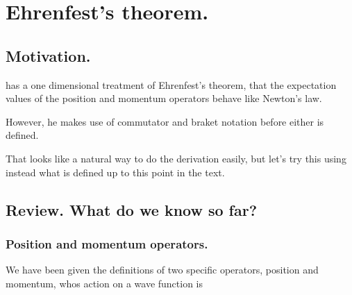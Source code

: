
%
%


\chapter{Ehrenfest's theorem. }
\label{chap:ehrenfest}
\date{ Jan 22, 2009.  $RCSfile: ehrenfest.tex,v $ Last $Revision: 1.14 $ $Date: 2009/06/14 23:51:45 $ }

%


\section{Motivation. }

\cite{mcmahon2005qmd} has a one dimensional treatment of Ehrenfest's theorem,
that the expectation values of the position and momentum operators behave
like Newton's law.

However, he makes use
of commutator and braket notation before either is defined.

That looks like a natural way to do the derivation easily, but let's try
this using instead what is defined up to this point in the text.

\section{Review.  What do we know so far? }

\subsection{Position and momentum operators. }

We have been given the definitions of two specific operators, position and momentum, 
whos action on a wave function is

